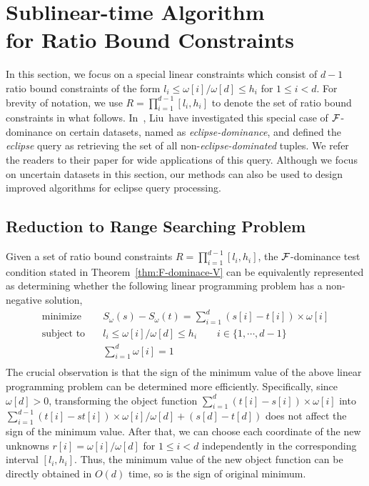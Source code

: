 \section{Sublinear-time Algorithm\\for Ratio Bound Constraints}\label{sec:eclprobalg}

In this section, we focus on a special linear constraints which consist of $d - 1$ ratio bound constraints of the form $l_i \le \omega[i]/\omega[d] \le h_i$ for $1 \le i < d$.
For brevity of notation, we use $R = \prod^{d-1}_{i = 1}[l_i, h_i]$ to denote the set of ratio bound constraints in what follows.
In~\cite{DBLP:conf/icde/Liu0ZP021}, Liu~\etal have investigated this special case of $\mathcal{F}$-dominance on certain datasets, named as \textit{eclipse-dominance}, and defined the \textit{eclipse} query as retrieving the set of all non-\textit{eclipse-dominated} tuples.
We refer the readers to their paper for wide applications of this query.
Although we focus on uncertain datasets in this section, our methods can also be used to design improved algorithms for eclipse query processing.

\subsection{Reduction to Range Searching Problem}

Given a set of ratio bound constraints $R = \prod^{d-1}_{i = 1}[l_i, h_i]$, the $\mathcal{F}$-dominance test condition stated in Theorem~\ref{thm:F-dominace-V} can be equivalently represented as determining whether the following linear programming problem has a non-negative solution,
\begin{equation}
	\begin{aligned}
		\text{minimize} \quad & S_\omega(s) - S_\omega(t) = \sum^d_{i = 1} (s[i] - t[i]) \times \omega[i] \\
		\text{subject to} \quad & l_i \le \omega[i]/\omega[d] \le h_i \qquad i \in \{1, \cdots, d - 1\} \\
        & \sum^d_{i = 1} \omega[i] = 1 \\ 
	\end{aligned}
	\label{eq:lp}
\end{equation}
The crucial observation is that the sign of the minimum value of the above linear programming problem can be determined more efficiently.
Specifically, since $\omega[d] > 0$, transforming the object function $\sum^d_{i = 1}(t[i] - s[i]) \times \omega[i]$ into $\sum^{d-1}_{i = 1}(t[i] -st[i]) \times \omega[i] / \omega[d] + (s[d] - t[d])$ does not affect the sign of the minimum value.
After that, we can choose each coordinate of the new unknowns $r[i] = \omega[i] / \omega[d]$ for $1 \le i < d$ independently in the corresponding interval $[l_i, h_i]$.
Thus, the minimum value of the new object function can be directly obtained in $O(d)$ time, so is the sign of original minimum.

